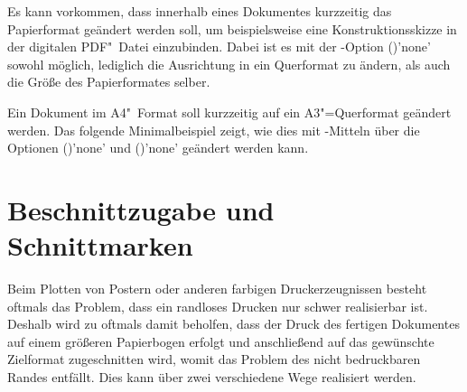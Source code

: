 Es kann vorkommen, dass innerhalb eines Dokumentes kurzzeitig das Papierformat 
geändert werden soll, um beispielsweise eine Konstruktionsskizze in der 
digitalen PDF"~Datei einzubinden. Dabei ist es mit der \KOMAScript-Option 
()'none' sowohl möglich, lediglich die 
Ausrichtung in ein Querformat zu ändern, als auch die Größe des Papierformates 
selber.
%
\begin{Example}
Ein Dokument im A4"~Format soll kurzzeitig auf ein A3"=Querformat geändert 
werden. Das folgende Minimalbeispiel zeigt, wie dies mit \KOMAScript-Mitteln 
über die Optionen ()'none' und 
()'none' geändert werden kann.
\end{Example}



\section{%
  Beschnittzugabe und Schnittmarken%
  \label{sec:tips:crop}%
}

%
Beim Plotten von Postern oder anderen farbigen Druckerzeugnissen besteht 
oftmals das Problem, dass ein randloses Drucken nur schwer realisierbar ist. 
Deshalb wird zu oftmals damit beholfen, dass der Druck des fertigen Dokumentes 
auf einem größeren Papierbogen erfolgt und anschließend auf das gewünschte 
Zielformat zugeschnitten wird, womit das Problem des nicht bedruckbaren Randes 
entfällt. Dies kann über zwei verschiedene Wege realisiert werden.

